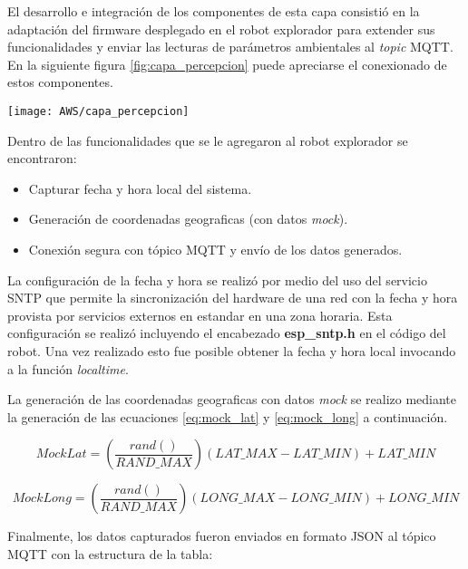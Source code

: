 El desarrollo e integración de los componentes de esta capa consistió en la adaptación del firmware desplegado en el robot explorador para extender sus funcionalidades y enviar las lecturas de parámetros ambientales al \textit{topic} MQTT. En la siguiente figura \ref{fig:capa_percepcion} puede apreciarse el conexionado de estos componentes.


\begin{center}
   \texttt{[image: AWS/capa\_percepcion]}
   \label{fig:capa_percepcion}
\end{center}


Dentro de las funcionalidades que se le agregaron al robot explorador se encontraron:

\begin{itemize}
	\item Capturar fecha y hora local del sistema.
	\item Generación de coordenadas geograficas (con datos \textit{mock}).
	\item Conexión segura con tópico MQTT y envío de los datos generados.	
		
\end{itemize}

La configuración de la fecha y hora se realizó por medio del uso del servicio SNTP \citep{sntp} que permite la sincronización del hardware de una red con la fecha y hora provista por servicios externos en estandar en una zona horaria. Esta configuración se realizó incluyendo el encabezado \textbf{esp\_sntp.h} en el código del robot. Una vez realizado esto fue posible obtener la fecha y hora local invocando a la función \textit{localtime}.

La generación de las coordenadas geograficas con datos \textit{mock} se realizo mediante la generación de las ecuaciones \ref{eq:mock_lat} y \ref{eq:mock_long} a continuación.

\begin{equation}
	\label{eq:mock_lat}
	MockLat = \left( \frac{rand()}{RAND\_MAX} \right) \left( LAT\_MAX - LAT\_MIN \right) + LAT\_MIN
\end{equation}
                
\begin{equation}
	\label{eq:mock_long}
	MockLong = \left( \frac{rand()}{RAND\_MAX} \right) \left( LONG\_MAX - LONG\_MIN \right) + LONG\_MIN
\end{equation}

Finalmente, los datos capturados fueron enviados en formato JSON al tópico MQTT con la estructura de la tabla:



